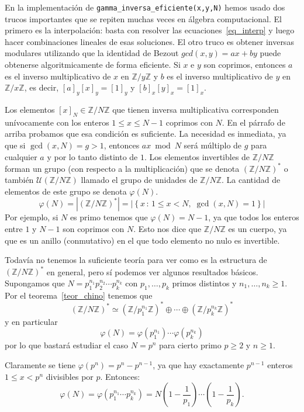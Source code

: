 \documentclass[a4paper, 11pt]{article}
\newcommand{\ZZ}{\mathbb{Z}}
\newcommand{\UU}{\mathcal{U}}
\theoremstyle{plain}
\theoremstyle{definition}
\begin{document}
En la implementación de \texttt{gamma\_inversa\_eficiente(x,y,N)} hemos
usado dos trucos importantes que se repiten muchas veces en álgebra
computacional. El primero es la interpolación: basta con resolver las
ecuaciones~\eqref{eq_interp} y luego hacer combinaciones lineales de
esas soluciones. El otro truco es obtener inversas modulares utilizando
que la identidad de Bezout $gcd(x,y)=ax+by$ puede obtenerse algoritmicamente
de forma eficiente. Si $x$ e $y$ son coprimos, entonces $a$ es el inverso
multiplicativo de $x$ en $\ZZ/y\ZZ$ y $b$ es el inverso multiplicativo de
$y$ en $\ZZ/x\ZZ$, es decir, $[a]_y[x]_y=[1]_y$ y $[b]_x[y]_x=[1]_x$.

\bigskip

Los elementos $[x]_N\in\ZZ/N\ZZ$ que tienen inversa multiplicativa corresponden
unívocamente con los enteros $1\leq x\leq N-1$ coprimos con $N$. En el
párrafo de arriba probamos que esa condición es suficiente. La necesidad
es inmediata, ya que si $\gcd(x,N)=g>1$, entonces $ax\bmod{N}$ será
múltiplo de $g$ para cualquier $a$ y por lo tanto distinto de $1$. Los
elementos invertibles de $\ZZ/N\ZZ$ forman un grupo (con respecto a la multiplicación) que se denota $(\ZZ/N\ZZ)^\ast$ o también $\UU(\ZZ/N\ZZ)$
llamado el grupo de unidades de $\ZZ/N\ZZ$. La cantidad de elementos de este
grupo se denota $\varphi(N)$.
\[
\varphi(N) = \left|(\ZZ/N\ZZ)^*\right|=
\left|\left\{x\,:\,1\leq x<N,\;\gcd(x,N)=1\right\}\right|
\]
Por ejemplo, si $N$ es primo tenemos que $\varphi(N)=N-1$, ya que todos
los enteros entre $1$ y $N-1$ son coprimos con $N$. Esto nos dice que $\ZZ/N\ZZ$
es un cuerpo, ya que es un anillo (conmutativo) en el que todo elemento no nulo
es invertible.

\bigskip

Todavía no tenemos la suficiente teoría para ver como es la estructura de
$(\ZZ/N\ZZ)^*$ en general, pero sí podemos ver algunos resultados básicos.
Supongamos que $N=p_1^{n_1}p_2^{n_2}\cdots p_k^{n_k}$ con $p_1,\ldots,p_k$
primos distintos y $n_1,\ldots,n_k\geq 1$. Por el teorema~\ref{teor_chino}
tenemos que
\[
   (\ZZ/N\ZZ)^*\simeq (\ZZ/p_1^{n_1}\ZZ)^*\oplus\cdots\oplus(\ZZ/p_k^{n_k}\ZZ)^*
\]
y en particular
\[
    \varphi(N)=\varphi(p_1^{n_1})\cdots\varphi(p_k^{n_k})
\]
por lo que bastará estudiar el caso $N=p^n$ para cierto primo $p\geq2$ y
$n\geq 1$.

\bigskip

Claramente se tiene $\varphi(p^n)=p^n-p^{n-1}$, ya que hay exactamente $p^{n-1}$
enteros $1\leq x<p^n$ divisibles por $p$. Entonces:
\[
   \varphi(N)=\varphi\left(p_1^{n_1}\cdots p_k^{n_k}\right)=N
   \left(1-\frac1{p_1}\right)\cdots\left(1-\frac1{p_k}\right).
\]
\end{document}
